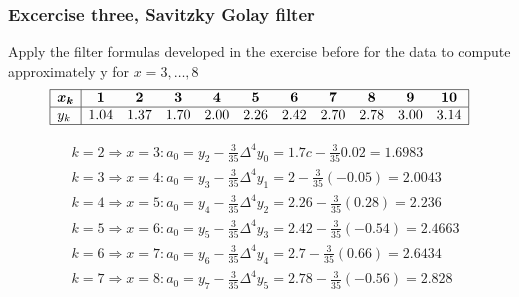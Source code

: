 \subsubsection{Excercise three, Savitzky Golay filter}
Apply the filter formulas developed in the exercise before for the data to compute approximately y for $x = 3, \dots , 8$
$$
\begin{array}{|l|cccccccccc|}
\hline \boldsymbol{x}_{\boldsymbol{k}} & \mathbf{1} & \mathbf{2} & \mathbf{3} & \mathbf{4} & \mathbf{5} & \mathbf{6} & \mathbf{7} & \mathbf{8} & \mathbf{9} & \mathbf{1 0} \\
\hline y_k & 1.04 & 1.37 & 1.70 & 2.00 & 2.26 & 2.42 & 2.70 & 2.78 & 3.00 & 3.14 \\
\hline
\end{array}
$$

$$
\begin{aligned}
&k=2 \Rightarrow x=3: a_0=y_2-\frac{3}{35} \Delta^4 y_0=1.7 c-\frac{3}{35} 0.02=1.6983 \\
&k=3 \Rightarrow x=4: a_0=y_3-\frac{3}{35} \Delta^4 y_1=2-\frac{3}{35}(-0.05)=2.0043 \\
&k=4 \Rightarrow x=5: a_0=y_4-\frac{3}{35} \Delta^4 y_2=2.26-\frac{3}{35}(0.28)=2.236 \\
&k=5 \Rightarrow x=6: a_0=y_5-\frac{3}{35} \Delta^4 y_3=2.42-\frac{3}{35}(-0.54)=2.4663 \\
&k=6 \Rightarrow x=7: a_0=y_6-\frac{3}{35} \Delta^4 y_4=2.7-\frac{3}{35}(0.66)=2.6434 \\
&k=7 \Rightarrow x=8: a_0=y_7-\frac{3}{35} \Delta^4 y_5=2.78-\frac{3}{35}(-0.56)=2.828
\end{aligned}
$$
